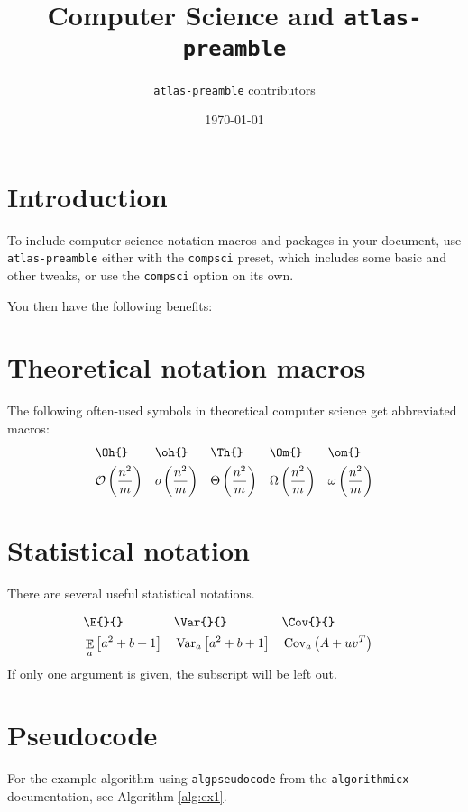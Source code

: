 \documentclass[11pt, a4paper]{article}
\title{Computer Science and \texttt{atlas-preamble}}
\author{\texttt{atlas-preamble} contributors}
\date{\today}
\begin{document}
\maketitle


\section{Introduction}
To include computer science notation macros and packages in your document, use \texttt{atlas-preamble} either with the \texttt{compsci} preset, which includes some basic and other tweaks, or use the \texttt{compsci} option on its own.

\noindent
You then have the following benefits:



\section{Theoretical notation macros}
The following often-used symbols in theoretical computer science get abbreviated macros:
\begin{align*}
	&\texttt{\textbackslash Oh\{\}} & &\texttt{\textbackslash oh\{\}} & &\texttt{\textbackslash Th\{\}} & &\texttt{\textbackslash Om\{\}} & &\texttt{\textbackslash om\{\}} \\
	&\mathcal{O}\left(\frac{n^2}{m}\right) & &o\left(\frac{n^2}{m}\right) & &\Theta\left(\frac{n^2}{m}\right) & &\Omega\left(\frac{n^2}{m}\right) & &\omega\left(\frac{n^2}{m}\right)
\end{align*}


\section{Statistical notation}

There are several useful statistical notations.

\begin{align*}
	&\texttt{\textbackslash E\{\}\{\}}
	&&\texttt{\textbackslash Var\{\}\{\}}
	&&\texttt{\textbackslash Cov\{\}\{\}} &  \\
	&\E{a}{a^2+b+1} 
	&& \Var{a}{a^2+b+1}
	&& \Cov{a}{A+u v^T} &
\end{align*}
If only one argument is given, the subscript will be left out.


\section{Pseudocode}
For the example algorithm using \texttt{algpseudocode} from the \texttt{algorithmicx} documentation, see Algorithm \ref{alg:ex1}.
\end{document}

